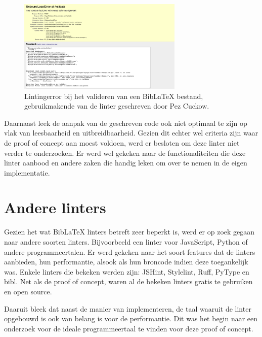 \begin{figure}[ht]
    \centering
    \includegraphics[width=0.7\textwidth]{./files/Pezmc-LinterError_cropped.png}
    \caption[Foutmelding BibLaTeX-linter]{Lintingerror bij het valideren van een BibLaTeX bestand, gebruikmakende van de linter geschreven door Pez Cuckow.}
    \label{fig:biblatex-linter-error}
\end{figure}

Daarnaast leek de aanpak van de geschreven code ook niet optimaal te zijn op vlak van leesbaarheid en uitbreidbaarheid. Gezien dit echter wel criteria zijn waar de proof of concept aan moest voldoen, werd er besloten om deze linter niet verder te onderzoeken. Er werd wel gekeken naar de functionaliteiten die deze linter aanbood en andere zaken die handig leken om over te nemen in de eigen implementatie.

\section{Andere linters}
Gezien het wat BibLaTeX linters betreft zeer beperkt is, werd er op zoek gegaan naar andere soorten linters. Bijvoorbeeld een linter voor JavaScript, Python of andere programmeertalen. Er werd gekeken naar het soort features dat de linters aanbieden, hun performantie, alsook als hun broncode indien deze toegankelijk was. Enkele linters die bekeken werden zijn: JSHint, Stylelint, Ruff, PyType en bibl. Net als de proof of concept, waren al de bekeken linters gratis te gebruiken en open source.

Daaruit bleek dat naast de manier van implementeren, de taal waaruit de linter opgebouwd is ook van belang is voor de performantie. Dit was het begin naar een onderzoek voor de ideale programmeertaal te vinden voor deze proof of concept. 

